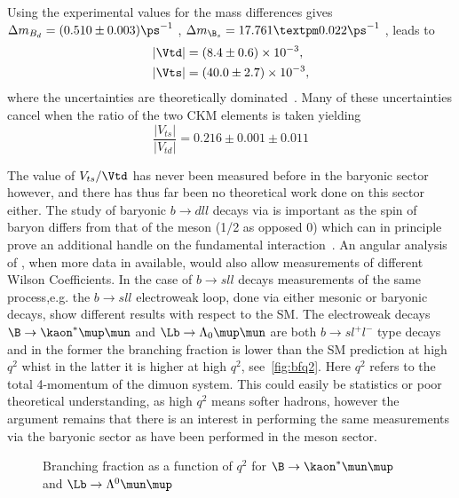 Using the experimental values for the mass differences gives $\Delta m_{B_{d}} = (0.510\pm0.003)\ps^{-1}$ \cite{pdg},  $\Delta m_{\B_{s}} = 17.761 ± 0.022\ps^{-1}$ \cite{bslhcb}, leads to
\begin{equation}
  \begin{split}
    & |\Vtd| = (8.4\pm0.6)\times 10^{-3},\\
    & |\Vts| = (40.0\pm2.7)\times 10^{-3},
  \end{split}
\end{equation}
where the uncertainties are theoretically dominated~\cite{pdg}. Many of these uncertainties cancel when the ratio of the two CKM elements is taken yielding
\begin{equation}
  \frac{|V_{ts}|}{|V_{td}|} = 0.216\pm0.001\pm 0.011
  \label{eq:vtsvtd}
\end{equation}


The value of $V_{ts}/\Vtd$ has never been measured before in the baryonic sector however, and there has thus far been no theoretical work done on this sector either. The study of baryonic $b\to dll$ decays via \Lbpi is important as the spin of \Lb baryon differs from that of the \B meson (1/2 as opposed 0) which can in principle prove an additional handle on the fundamental interaction~\cite{Meinel}. An angular analysis of \Lbpi, when more data in available, would also allow measurements of different Wilson Coefficients. In the case of $b\to sll$ decays measurements of the same process,e.g. the $b\to sll$ electroweak loop, done via either mesonic or baryonic decays, show different results with respect to the SM. The electroweak decays $\B\to\kaon^{*}\mup\mun$ and $\Lb\to\Lambda_{0}\mup\mun$ are both $b\to sl^{+}l^{-}$ type decays and in the former the branching fraction is lower than the SM prediction at high $q^{2}$ whist in the latter it is higher at high $q^{2}$, see~\autoref{fig:bfq2}. Here $q^{2}$ refers to the total 4-momentum of the dimuon system. This could easily be statistics or poor theoretical understanding, as high $q^{2}$ means softer hadrons, however the argument remains that there is an interest in performing the same measurements via the baryonic sector as have been performed in the meson sector.
\begin{figure}[!h]\def\nh{0.5\textwidth}
  \centering
  \hspace*{-2cm}  
  \caption{Branching fraction as a function of $q^{2}$ for \protect{} $\B\to\kaon^{*}\mun\mup$~\cite{LHCB-PAPER-2015-051} and \protect{} $\Lb\to\Lambda^{0}\mun\mup$~\cite{LHCB-PAPER-2015-009}}
  \label{fig:bfq2}
\end{figure}
